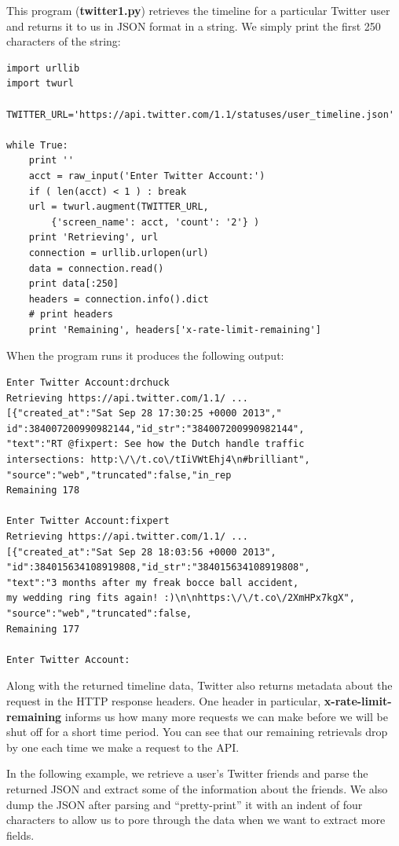 \documentclass[11pt]{book}
\begin{document}
This program ({\bf twitter1.py}) retrieves the timeline
for a particular Twitter user and returns it to us in JSON
format in a string.  We simply print the first 250 characters
of the string:

\beforeverb
\begin{verbatim}
import urllib
import twurl

TWITTER_URL='https://api.twitter.com/1.1/statuses/user_timeline.json'

while True:
    print ''
    acct = raw_input('Enter Twitter Account:')
    if ( len(acct) < 1 ) : break
    url = twurl.augment(TWITTER_URL,
        {'screen_name': acct, 'count': '2'} )
    print 'Retrieving', url
    connection = urllib.urlopen(url)
    data = connection.read()
    print data[:250]
    headers = connection.info().dict
    # print headers
    print 'Remaining', headers['x-rate-limit-remaining']
\end{verbatim}
\afterverb
%
When the program runs it produces the following output: 
 
\beforeverb
\begin{verbatim}
Enter Twitter Account:drchuck
Retrieving https://api.twitter.com/1.1/ ...
[{"created_at":"Sat Sep 28 17:30:25 +0000 2013","
id":384007200990982144,"id_str":"384007200990982144",
"text":"RT @fixpert: See how the Dutch handle traffic 
intersections: http:\/\/t.co\/tIiVWtEhj4\n#brilliant",
"source":"web","truncated":false,"in_rep
Remaining 178

Enter Twitter Account:fixpert
Retrieving https://api.twitter.com/1.1/ ...
[{"created_at":"Sat Sep 28 18:03:56 +0000 2013",
"id":384015634108919808,"id_str":"384015634108919808",
"text":"3 months after my freak bocce ball accident, 
my wedding ring fits again! :)\n\nhttps:\/\/t.co\/2XmHPx7kgX",
"source":"web","truncated":false,
Remaining 177

Enter Twitter Account:
\end{verbatim}
\afterverb
%
Along with the returned timeline data, Twitter also returns
metadata about the request in the HTTP response headers. 
One header in particular, {\bf x-rate-limit-remaining} informs
us how many more requests we can make before we will be shut 
off for a short time period.  You can see that our remaining 
retrievals drop by one each time we make a request to the 
API.

In the following example, we retrieve a user's Twitter friends
and parse the returned JSON and extract some of the information
about the friends.  We also dump the JSON after parsing and
``pretty-print'' it with an indent of four characters to allow
us to pore through the data when we want to extract more fields.
\end{document}
